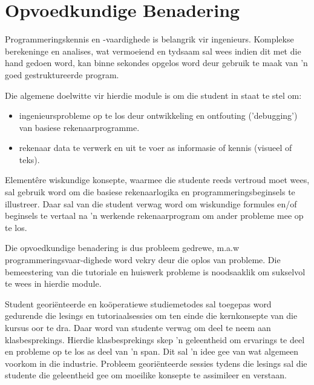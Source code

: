 \section{Opvoedkundige Benadering}
    Programmeringskennis en -vaardighede is belangrik vir ingenieurs. Komplekse 
    berekeninge en analises, wat vermoeiend en tydsaam sal wees indien dit met die 
    hand gedoen word, kan binne sekondes opgelos word deur gebruik te maak van 'n 
    goed gestruktureerde program.

    Die algemene doelwitte vir hierdie module is om die student in staat te stel om:
    \begin{itemize}
        \item ingenieursprobleme op te los
	      deur ontwikkeling en ontfouting ('debugging') van basiese 
	      rekenaarprogramme.
        \item rekenaar data te verwerk en uit 
	      te voer as informasie of kennis (visueel of teks).
    \end{itemize}

    Element\^{e}re wiskundige konsepte, waarmee die studente reeds vertroud 
    moet wees, sal gebruik word om die basiese rekenaarlogika en 
    programmeringsbeginsels 
    te illustreer. Daar sal van die student verwag word om 
    wiskundige formules en/of beginsels te vertaal na 'n werkende 
    rekenaarprogram
    om ander probleme mee op te los.

    Die opvoedkundige benadering is dus probleem gedrewe, m.a.w 
    programmeringsvaar-dighede 
    word vekry deur die oplos van probleme. Die bemeestering van die
    tutoriale en huiswerk probleme is noodsaaklik om sukselvol te wees in hierdie
    module.
    
    Student geori\"{e}nteerde en ko\"{o}peratiewe studiemetodes sal toegepas word 
    gedurende die lesings en tutoriaalsessies om ten einde die kernkonsepte
    van die kursus oor te dra.  Daar word van studente verwag om deel te neem 
    aan klasbesprekings. Hierdie klasbesprekings skep 'n geleentheid om ervarings te deel
    en probleme op te los as deel van 'n span.  Dit sal 'n idee gee van wat 
    algemeen voorkom in die industrie. Probleem geori\"{e}nteerde sessies tydens die lesings
    sal die studente die geleentheid gee om moeilike konsepte te 
    assimileer en verstaan.


